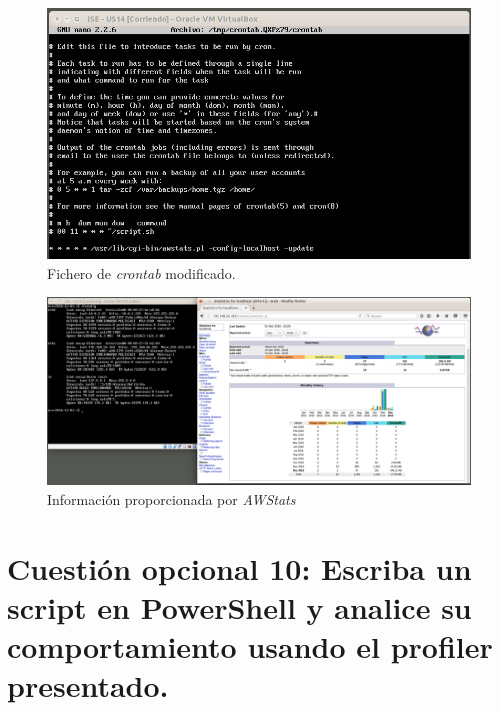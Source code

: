 \documentclass[a4paper,titlepage,12pt]{report}	%
\numberwithin{figure}{section} %
\numberwithin{table}{section} %
\begin{document}
	\begin{figure}[H]
	   \includegraphics[width=\linewidth]{./Imagenes/P3/O6-3.png}
	   \vspace{-0.5cm}
	   \caption[Fichero de \textit{crontab} modificado.]{Fichero de \textit{crontab} modificado.}
	   \label{P3-O6-3}
	\end{figure}

	\begin{figure}[H]
	   \includegraphics[width=\linewidth]{./Imagenes/P3/O6-4.png}
	   \vspace{-0.5cm}
	   \caption[Información proporcionada por \textit{AWStats}.]{Información proporcionada por \textit{AWStats}}
	   \label{P3-O6-4}
	\end{figure}

	\section[Cuestión opcional 10: Escriba un script en PowerShell y analice su comportamiento usando el profiler presentado.]{Cuestión opcional 10: Escriba un script en PowerShell y analice su comportamiento usando el profiler presentado.}
\end{document}
